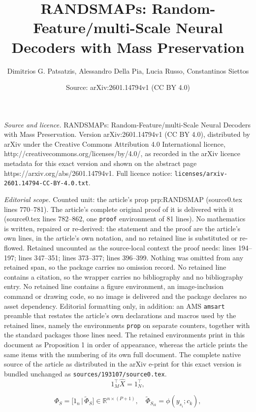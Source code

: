 \documentclass[10pt,a4paper]{amsart}
\title{RANDSMAPs: Random-Feature/multi-Scale Neural Decoders with Mass Preservation}
\author{Dimitrios G. Patsatzis, Alessandro Della Pia, Lucia Russo, Constantinos Siettos}
\date{Source: arXiv:2601.14794v1 (CC BY 4.0)}
\begin{document}
\maketitle

\noindent\emph{Source and licence.} RANDSMAPs: Random-Feature/multi-Scale Neural Decoders with Mass Preservation. Version arXiv:2601.14794v1 (CC BY 4.0), distributed by arXiv under the Creative Commons Attribution 4.0 International licence, http://creativecommons.org/licenses/by/4.0/, as recorded in the arXiv licence metadata for this exact version and shown on the abstract page https://arxiv.org/abs/2601.14794v1. Full licence notice: \texttt{licenses/arxiv-2601.14794-CC-BY-4.0.txt}.\par\smallskip

\noindent\textit{Editorial scope.} Counted unit: the article's prop prp:RANDSMAP (source0.tex lines 770--781). The article's complete original proof of it is delivered with it (source0.tex lines 782--862, one \texttt{proof} environment of 81 lines). No mathematics is written, repaired or re-derived: the statement and the proof are the article's own lines, in the article's own notation, and no retained line is substituted or re-flowed.  Retained uncounted as the source-local context the proof needs: lines 194--197; lines 347--351; lines 373--377; lines 396--399.  Nothing was omitted from any retained span, so the package carries no omission record.  No retained line contains a citation, so the wrapper carries no bibliography and no bibliography entry.  No retained line contains a figure environment, an image-inclusion command or drawing code, so no image is delivered and the package declares no asset dependency.  Editorial formatting only, in addition: an AMS \texttt{amsart} preamble that restates the article's own declarations and macros used by the retained lines, namely the environments \texttt{prop} on separate counters, together with the standard packages those lines need.  The retained environments print in this document as Proposition 1 in order of appearance, whereas the article prints the same items with the numbering of its own full document.  The complete native source of the article as distributed in the arXiv e-print for this exact version is bundled unchanged as \texttt{sources/193107/source0.tex}.
\begin{equation}
    1_M^\top \widehat{X} = 1_N^\top,
    \label{eq:s2one_cons_recon}
\end{equation}

\begin{equation}
\Phi_S = \big[1_n \, | \, \widetilde{\Phi}_S \big]
\in\mathbb{R}^{n\times (P+1)}, \quad \widetilde{\Phi}_{S_{ik}}=\phi(y_{s_i}; c_{k}),
\label{eq:RFNNBasis}
\end{equation} 
\end{document}
